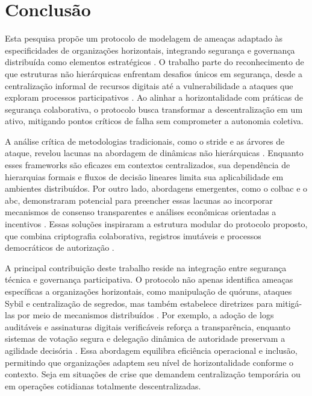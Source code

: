 
%

\chapter{Conclusão}
\label{cha:conclusion}

\glsresetall

Esta pesquisa propõe um protocolo de modelagem de ameaças adaptado às
especificidades de organizações horizontais, integrando segurança e governança
distribuída como elementos estratégicos \cite{Colbac}. O trabalho parte do reconhecimento de
que estruturas não hierárquicas enfrentam desafios únicos em segurança, desde a
centralização informal de recursos digitais até a vulnerabilidade a ataques que
exploram processos participativos \cite{EverydayRevolutions, MitigationSybilAttack}.
Ao alinhar a horizontalidade com práticas de segurança colaborativa,
o protocolo busca transformar a descentralização em um ativo, mitigando
pontos críticos de falha sem comprometer a autonomia coletiva.

A análise crítica de metodologias tradicionais, como o \gls{stride} e as árvores
de ataque, revelou lacunas na abordagem de dinâmicas não hierárquicas
\cite{ThreatModelingdesigningForSecurity, AttackTrees}. Enquanto
esses frameworks são eficazes em contextos centralizados, sua dependência de
hierarquias formais e fluxos de decisão lineares limita sua aplicabilidade em
ambientes distribuídos. Por outro lado, abordagens emergentes, como o
\gls{colbac} e o \gls{abc}, demonstraram potencial para preencher essas lacunas
ao incorporar mecanismos de consenso transparentes e análises econômicas
orientadas a incentivos \cite{Colbac, AbcCrypto}. Essas soluções
inspiraram a estrutura modular do protocolo proposto, que
combina criptografia colaborativa, registros imutáveis e
processos democráticos de autorização \cite{Colbac, ThreatModelingdesigningForSecurity}.

A principal contribuição deste trabalho reside na integração entre segurança
técnica e governança participativa. O protocolo não apenas identifica ameaças
específicas a organizações horizontais, como manipulação de quóruns, ataques
Sybil e centralização de segredos, mas também estabelece diretrizes para
mitigá-las por meio de mecanismos distribuídos  \cite{Colbac, MitigationSybilAttack}.
Por exemplo, a adoção de logs auditáveis e assinaturas digitais
verificáveis reforça a transparência, enquanto sistemas de votação
segura e delegação dinâmica de autoridade preservam a agilidade decisória \cite{Colbac}.
Essa abordagem equilibra eficiência operacional e inclusão,
permitindo que organizações adaptem seu nível de horizontalidade conforme o
contexto. Seja em situações de crise que demandem centralização temporária ou em
operações cotidianas totalmente descentralizadas.

